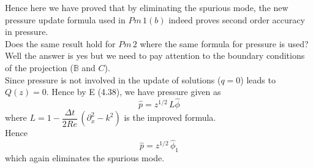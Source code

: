 Hence here we have proved that by eliminating the spurious mode, the new pressure update formula used in $Pm\,1(b)$ indeed proves second order accuracy in pressure.\\

Does the same result hold for $Pm\,2$ where the same formula for pressure is used? Well the answer is yes but we need to pay attention to the boundary conditions of the projection ($\mathbb{B}$ and $C$).\\

Since pressure is not involved in the update of solutions ($q = 0$) leads to $Q(z) = 0$. Hence by E (4.38), we have pressure given as
\begin{equation}
\hat{p} = z^{1/2}\,L\hat{\phi}
\end{equation}
where $L = 1 - \dfrac{\Delta t}{2Re}\,(\partial_x^2 - k^2)$ is the improved formula. \\
Hence
\begin{equation}
\hat{p} = z^{1/2}\,\hat{\phi}_1
\end{equation}
which again eliminates the spurious mode.\\

